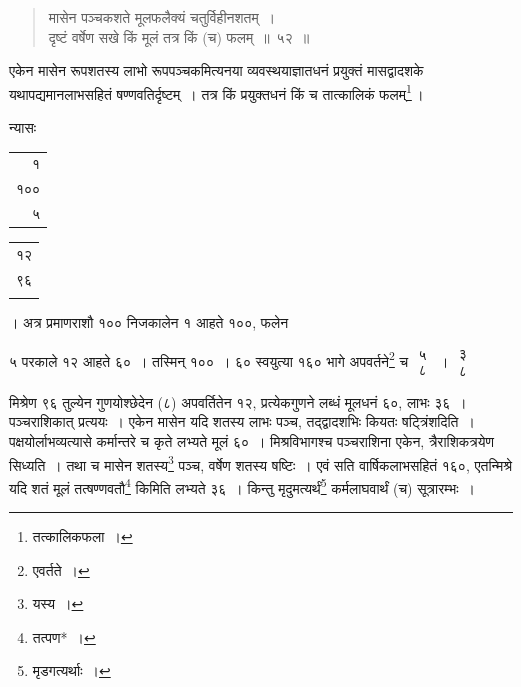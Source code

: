 \documentclass[10pt, openany]{book}
\begin{document}
{{\vspace{0.4cm}{उदाहरणम्\textemdash}

\begin{quote}
    
{\eg मासेन पञ्चकशते मूलफलैक्यं चतुर्विहीनशतम्~। \\
 दृष्टं वर्षेण सखे किं मूलं तत्र किं (च) फलम्~॥~५२~॥}\end{quote} 

{एकेन मासेन रूपशतस्य लाभो रूपपञ्चकमित्यनया व्यवस्थयाज्ञातधनं प्रयुक्तं
मासद्वादशके यथापद्यमानलाभसहितं षण्णवतिर्दृष्टम्~। तत्र किं प्रयुक्तधनं किं
च तात्कालिकं फलम्\renewcommand{\thefootnote}{\s १२}\footnote{\s तत्कालिकफला~।}\,।}


\newpage

{न्यासः\textendash \,\begin{tabular}{r}१ \\१०० \\५ \end{tabular}\begin{tabular}{c} १२ \\९६ \\ \\ \end{tabular}। अत्र प्रमाणराशौ १०० निजकालेन १ आहते १००, फलेन}
{५ परकाले १२ आहते ६०~। तस्मिन् १००~। ६० स्वयुत्या १६० भागे अपवर्तने\renewcommand{\thefootnote}{\s १}\footnote{\s एवर्तते~।} च}
$\begin{matrix}

\mbox{{५}}\\

\mbox{{८}}

\end{matrix}$~। $\begin{matrix}

\mbox{{३}}\\

\mbox{{८}}

\end{matrix}$}
{मिश्रेण ९६ तुल्येन गुणयोश्छेदेन (८) अपवर्तितेन १२, प्रत्येकगुणने लब्धं
मूलधनं ६०, लाभः}
{३६~। पञ्चराशिकात् प्रत्ययः~। एकेन मासेन यदि शतस्य लाभः पञ्च,
तद्द्वादशभिः कियतः षट्त्रिंशदिति~। पक्षयोर्लाभव्यत्यासे कर्मान्तरे च कृते लभ्यते मूलं ६०~।
मिश्रविभागश्च पञ्चराशिना एकेन, त्रैराशिकत्रयेण सिध्यति~। तथा च मासेन शतस्य\renewcommand{\thefootnote}{\s २}\footnote{\s यस्य~।} पञ्च, वर्षेण
शतस्य षष्टिः~। एवं}
{सति वार्षिकलाभसहितं १६०, एतन्मिश्रे यदि शतं मूलं तत्षण्णवतौ\renewcommand{\thefootnote}{\s ३}\footnote{\s तत्पण*~।} किमिति लभ्यते ३६~।}
{किन्तु मृदुमत्यर्थं\renewcommand{\thefootnote}{\s ४}\footnote{\s मृडगत्यर्थाः~।} कर्मलाघवार्थं (च) सूत्रारम्भः~।} 

}
\end{document}
